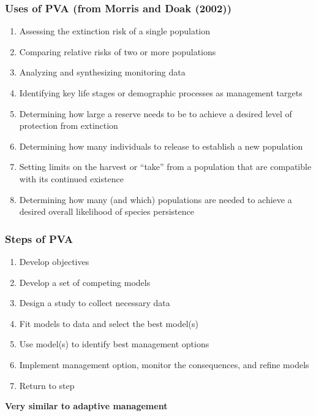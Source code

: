 \documentclass[color=usenames,dvipsnames]{beamer}\usepackage[]{graphicx}\usepackage[]{color}
\begin{document}
\begin{frame}
  \frametitle{Uses of PVA (from Morris and Doak (2002))}
  \large
  \begin{enumerate}[\bf (1)]
    \item<1-| alert@1> Assessing the extinction risk of a single population
    \item<2-| alert@2> Comparing relative risks of two or more populations
    \item<3-| alert@3> Analyzing and synthesizing monitoring data
    \item<4-| alert@4> Identifying key life stages or demographic processes as
      management targets
    \item<5-| alert@5> Determining how large a reserve needs to be to achieve a
      desired level of protection from extinction
    \item<6-| alert@6> Determining how many individuals to release to establish a
      new population
    \item<7-| alert@7> Setting limits on the harvest or ``take'' from a population
      that are compatible with its continued existence
    \item<8-| alert@8> Determining how many (and which) populations are needed to
      achieve a desired overall likelihood of species persistence
  \end{enumerate}
\end{frame}




\begin{frame}
  \frametitle{Steps of PVA}
  \large
  \begin{enumerate}[\bf (1)]
    \item Develop objectives
    \item Develop a set of competing models
    \item Design a study to collect necessary data
    \item Fit models to data and select the best model(s)
    \item Use model(s) to identify best management options
    \item Implement management option, monitor the consequences, and refine models
    \item Return to step \color{beamer@blendedblue}{\bf (4)}
  \end{enumerate}
  \vfill
  \centering
  \pause
  {\bf Very similar to adaptive management \\}
\end{frame}
\end{document}
